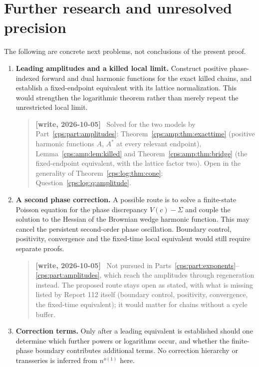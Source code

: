 \documentclass[11pt,letterpaper]{article}
\numberwithin{equation}{section}
\theoremstyle{remark}\newtheorem{remark}[theorem]{Remark}
\newenvironment{writenotelog}{\begin{quote}\small\sloppy\textbf{[write, 2026-10-05]}\ }{\end{quote}}
\begin{document}
\section{Further research and unresolved precision}\label{cps:log:sec:research}
The following are concrete next problems, not conclusions of the present
proof.
\begin{enumerate}
\item \textbf{Leading amplitudes and a killed local limit.}
Construct positive phase-indexed forward and dual harmonic functions for
the exact killed chains, and establish a fixed-endpoint equivalent with
its lattice normalization. This would strengthen the logarithmic theorem
rather than merely repeat the unrestricted local limit.

\begin{writenotelog}
Solved for the two models by Part~\ref{cps:part:amplitudes}: Theorem~\ref{cps:amp:thm:exacttime}
(positive harmonic functions $A$, $A^*$ at every relevant endpoint), Lemma~\ref{cps:amp:lem:killed}
and Theorem~\ref{cps:amp:thm:bridge} (the fixed-endpoint equivalent, with the lattice factor two).
Open in the generality of Theorem~\ref{cps:log:thm:cone}: Question~\ref{cps:log:q:amplitude}.
\end{writenotelog}
\item \textbf{A second phase correction.}
A possible route is to solve a finite-state Poisson equation for the
phase discrepancy $V(c)-\Sigma$ and couple the solution to the Hessian
of the Brownian wedge harmonic function. This may cancel the persistent
second-order phase oscillation. Boundary control, positivity, convergence
and the fixed-time local equivalent would still require separate proofs.

\begin{writenotelog}
Not pursued in Parts~\ref{cps:part:exponents}--\ref{cps:part:amplitudes}, which reach the
amplitudes through regeneration instead. The proposed route stays open as stated, with what is
missing listed by Report 112 itself (boundary control, positivity, convergence, the fixed-time
equivalent); it would matter for chains without a cycle buffer.
\end{writenotelog}
\item \textbf{Correction terms.}
Only after a leading equivalent is established should one determine
which further powers or logarithms occur, and whether the finite-phase
boundary contributes additional terms. No correction hierarchy or
transseries is inferred from $n^{o(1)}$ here.


\end{enumerate}
\end{document}
